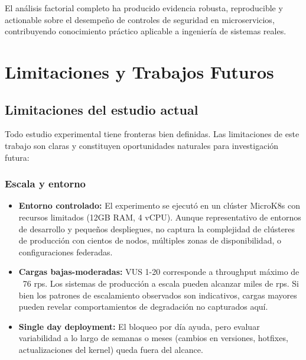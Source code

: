 El análisis factorial completo ha producido evidencia robusta, reproducible y actionable sobre el desempeño de controles de seguridad en microservicios, contribuyendo conocimiento práctico aplicable a ingeniería de sistemas reales.

\chapter{Limitaciones y Trabajos Futuros}
\label{cap:limitacionesyfuturos}

\section{Limitaciones del estudio actual}

Todo estudio experimental tiene fronteras bien definidas. Las limitaciones de este trabajo son claras y constituyen oportunidades naturales para investigación futura:

\subsection{Escala y entorno}
\begin{itemize}
	\item \textbf{Entorno controlado:} El experimento se ejecutó en un clúster MicroK8s con recursos limitados (12GB RAM, 4 vCPU). Aunque representativo de entornos de desarrollo y pequeños despliegues, no captura la complejidad de clústeres de producción con cientos de nodos, múltiples zonas de disponibilidad, o configuraciones federadas.
	\item \textbf{Cargas bajas-moderadas:} VUS 1-20 corresponde a throughput máximo de ~76 rps. Los sistemas de producción a escala pueden alcanzar miles de rps. Si bien los patrones de escalamiento observados son indicativos, cargas mayores pueden revelar comportamientos de degradación no capturados aquí.
	\item \textbf{Single day deployment:} El bloqueo por día ayuda, pero evaluar variabilidad a lo largo de semanas o meses (cambios en versiones, hotfixes, actualizaciones del kernel) queda fuera del alcance.
\end{itemize}

